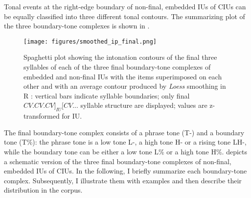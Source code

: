 Tonal events at the right-edge boundary of non-final, embedded IUs of CIUs can be equally classified into three different tonal contours. The summarizing plot of the three boundary-tone complexes is shown in   .

\begin{figure}
	\texttt{[image: figures/smoothed\_ip\_final.png]}
	\caption{Spaghetti plot showing the  intonation contours of the final three syllables of each of the three final boundary-tone complexes of embedded and non-final IUs with the items superimposed on each other and with an average contour produced by \textit{Loess} smoothing in R \citep{R_manual}: vertical bars indicate syllable boundaries; only final $CV.CV.CV]_{IU}[CV...$ syllable structure are displayed; values are z-transformed for IU.}
	\label{spaghetti plot-ip-final}
\end{figure}

The final boundary-tone complex consists of a phrase tone (T-) and a boundary tone (T\%): the phrase tone is a low tone L-, a high tone H- or a rising tone LH-, while the boundary tone can be either a low tone L\% or a high tone H\%.    depicts a schematic version of the three final boundary-tone complexes of non-final, embedded IUs of CIUs. In the following, I briefly summarize each boundary-tone complex. Subsequently, I illustrate them with examples and then describe their distribution in the corpus.


